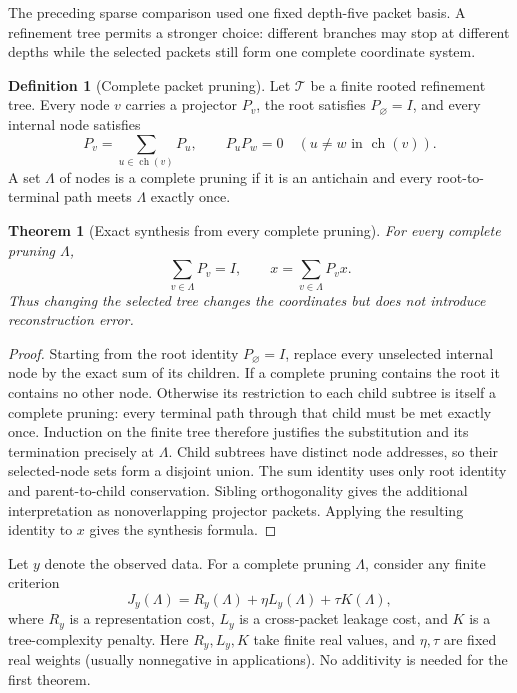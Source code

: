 \documentclass[11pt,letterpaper]{article}
\newtheorem{theorem}{Theorem}[section]
\theoremstyle{plain}
\theoremstyle{plain}
\theoremstyle{plain}
\theoremstyle{definition}
\newtheorem{definition}[definition]{Definition}
\theoremstyle{definition}
\theoremstyle{definition}
\theoremstyle{definition}
\theoremstyle{remark}
\theoremstyle{remark}
\theoremstyle{remark}
\theoremstyle{remark}
\begin{document}
The preceding sparse comparison used one fixed depth-five packet basis.  A refinement tree permits a stronger choice: different branches may stop at different depths while the selected packets still form one complete coordinate system.

\begin{definition}[Complete packet pruning]\label{core:record:22}
Let $\mathcal T$ be a finite rooted refinement tree.  Every node $v$ carries a projector $P_v$, the root satisfies $P_{\varnothing}=I$, and every internal node satisfies
\[
P_v=\sum_{u\in\operatorname{ch}(v)}P_u,
\qquad
P_uP_w=0\quad(u\ne w\text{ in }\operatorname{ch}(v)).
\]
A set $\Lambda$ of nodes is a complete pruning if it is an antichain and every root-to-terminal path meets $\Lambda$ exactly once.
\end{definition}

\begin{theorem}[Exact synthesis from every complete pruning]\label{result:13}
For every complete pruning $\Lambda$,
\[
\boxed{\sum_{v\in\Lambda}P_v=I,}
\qquad
\boxed{x=\sum_{v\in\Lambda}P_vx.}
\]
Thus changing the selected tree changes the coordinates but does not introduce reconstruction error.
\end{theorem}

\begin{proof}
Starting from the root identity $P_{\varnothing}=I$, replace every unselected internal node by the exact sum of its children.  If a complete pruning contains the root it contains no other node. Otherwise its restriction to each child subtree is itself a complete pruning: every terminal path through that child must be met exactly once. Induction on the finite tree therefore justifies the substitution and its termination precisely at $\Lambda$. Child subtrees have distinct node addresses, so their selected-node sets form a disjoint union. The sum identity uses only root identity and parent-to-child conservation. Sibling orthogonality gives the additional interpretation as nonoverlapping projector packets.  Applying the resulting identity to $x$ gives the synthesis formula.
\end{proof}

Let $y$ denote the observed data.  For a complete pruning $\Lambda$, consider any finite criterion
\[
J_y(\Lambda)
=
R_y(\Lambda)
+\eta L_y(\Lambda)
+\tau K(\Lambda),
\]
where $R_y$ is a representation cost, $L_y$ is a cross-packet leakage cost, and $K$ is a tree-complexity penalty.  Here $R_y,L_y,K$ take finite real values, and $\eta,\tau$ are fixed real weights (usually nonnegative in applications). No additivity is needed for the first theorem.
\end{document}
